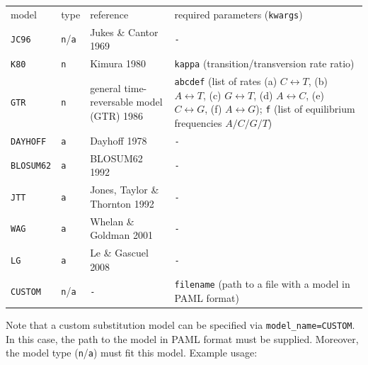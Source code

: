 \documentclass[hidelinks,11pt]{article}
\newcommand{\sq}{\textquotesingle}
\begin{document}
\vspace{3mm}
{\small\centering
	\begin{longtable}{ p{1.5cm} p{1.0cm} p{5.5cm} p{5.5cm}}
		model & type & reference & required parameters (\texttt{kwargs})\\
		\texttt{JC96} & \texttt{n}/\texttt{a} & Jukes \& Cantor 1969 \citep{jukes1969} & \texttt{-}\\
		\texttt{K80} & \texttt{n} & Kimura 1980 \citep{kimura1980} & \texttt{kappa} (transition/transversion rate ratio)\\
		\texttt{GTR} & \texttt{n} & general time-reversable model (GTR) 1986 \citep{tavare1986} & \texttt{abcdef} (list of rates (a) $C\leftrightarrow T$, (b) $A\leftrightarrow T$, (c) $G\leftrightarrow T$, (d) $A\leftrightarrow C$, (e) $C\leftrightarrow G$, (f) $A\leftrightarrow G$);\newline
		\texttt{f} (list of equilibrium frequencies $A/C/G/T$)\\
		\texttt{DAYHOFF} & \texttt{a} & Dayhoff 1978 \citep{dayhoff1978} & \texttt{-}\\
		\texttt{BLOSUM62} & \texttt{a} & BLOSUM62 1992 \citep{henikoff1992} & \texttt{-}\\
		\texttt{JTT} & \texttt{a} & Jones, Taylor \& Thornton 1992 \citep{jones1992} & \texttt{-}\\
		\texttt{WAG} & \texttt{a} & Whelan \& Goldman 2001 \citep{whelan2001} & \texttt{-}\\
		\texttt{LG} & \texttt{a} & Le \& Gascuel 2008 \citep{le2008} & \texttt{-}\\
		\texttt{CUSTOM} & \texttt{n}/\texttt{a} & \texttt{-} & \texttt{filename} (path to a file with a model in PAML \citep{yang1997} format)\\
	\end{longtable}
}
\vspace{3mm}

Note that a custom substitution model can be specified via
\texttt{model\_name=\sq CUSTOM\sq}.
In this case, the path to the model in PAML \citep{yang1997} format must be supplied.
Moreover, the model type (\texttt{n}/\texttt{a}) must fit this model.
Example usage:
\end{document}
